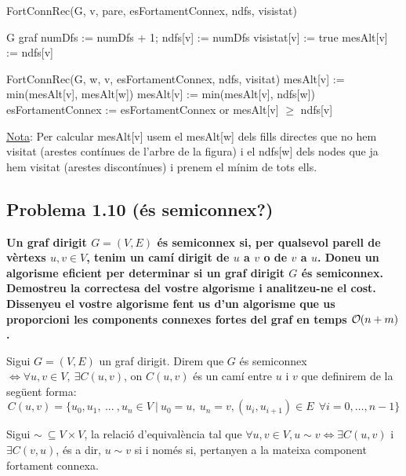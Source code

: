 \documentclass[a4paper,12pt]{article}
\DeclareRobustCommand{\bigO}{%
  \text{\usefont{OMS}{cmsy}{m}{n}O}%
}
\begin{document}
\begin{algorithm}[H]
    \caption{FortConnRec(G, v, pare, esFortamentConnex, ndfs, visistat)}
    \begin{algorithmic}[1]  %
        \Require G graf
        \State numDfs := numDfs + 1; ndfs[v] := numDfs
        \State visistat[v] := true
        \State mesAlt[v] := ndfs[v]

        \State
        
                \State FortConnRec(G, w, v, esFortamentConnex, ndfs, visitat)
                \State mesAlt[v] := min(mesAlt[v], mesAlt[w])
            \Else
                \State mesAlt[v] := min(mesAlt[v], ndfs[w])
            \EndIf
        \EndFor
        \State
            \State  esFortamentConnex := esFortamentConnex or mesAlt[v] $\geq$ ndfs[v]
        \EndIf
    \end{algorithmic}
\end{algorithm}

\underline{Nota}: Per calcular mesAlt[v] usem el mesAlt[w] dels fills directes que no hem visitat (arestes contínues de l'arbre de la figura) i el ndfs[w] dels nodes que ja hem visitat (arestes discontínues) i prenem el mínim de tots ells.

\subsection*{Problema 1.10 (és semiconnex?)}
\textbf{Un graf dirigit $G = (V, E)$ és semiconnex si, per qualsevol parell de vèrtexs $u, v \in V$, tenim un camí dirigit de $u$ a $v$ o de $v$ a $u$.
Doneu un algorisme eficient per determinar si un graf dirigit $G$ és semiconnex. Demostreu la correctesa del vostre algorisme i analitzeu-ne el cost. Dissenyeu el vostre algorisme fent us d'un algorisme que us proporcioni les components connexes fortes del graf en temps $\bigO(n + m)$.}

Sigui $G = (V,E)$ un graf dirigit. Direm que $G$ és semiconnex $\Longleftrightarrow \forall u,v \in V, \ \exists  C(u,v)$, on $C(u,v)$ és un camí entre $u$ i $v$ que definirem de la següent forma:
$$C(u,v) = \{u_0, u_1, \ ... \ , u_n \in V \ | \ u_0 = u, \ u_n = v, (u_i, u_{i+1}) \in E \ \ \forall i = 0, \dots, n-1 \}$$

Sigui $\sim \ \subseteq V\times V$, la relació d'equivalència tal que $\forall u,v \in V, u \sim v \Longleftrightarrow \exists C(u,v)$ i $\exists C(v,u)$, és a dir, $u \sim v$ si i només si, pertanyen a la mateixa component fortament connexa.
\end{document}
